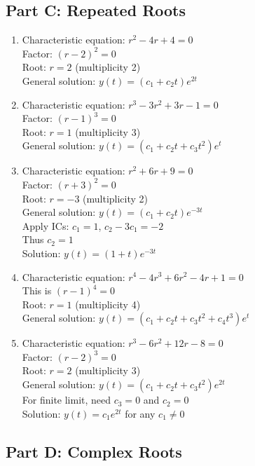 \documentclass[12pt]{article}
\begin{document}
\subsection*{Part C: Repeated Roots}

\begin{enumerate}[resume]
\item Characteristic equation: $r^2 - 4r + 4 = 0$\\
Factor: $(r-2)^2 = 0$\\
Root: $r = 2$ (multiplicity 2)\\
General solution: $y(t) = (c_1 + c_2t)e^{2t}$

\item Characteristic equation: $r^3 - 3r^2 + 3r - 1 = 0$\\
Factor: $(r-1)^3 = 0$\\
Root: $r = 1$ (multiplicity 3)\\
General solution: $y(t) = (c_1 + c_2t + c_3t^2)e^t$

\item Characteristic equation: $r^2 + 6r + 9 = 0$\\
Factor: $(r+3)^2 = 0$\\
Root: $r = -3$ (multiplicity 2)\\
General solution: $y(t) = (c_1 + c_2t)e^{-3t}$\\
Apply ICs: $c_1 = 1$, $c_2 - 3c_1 = -2$\\
Thus $c_2 = 1$\\
Solution: $y(t) = (1 + t)e^{-3t}$

\item Characteristic equation: $r^4 - 4r^3 + 6r^2 - 4r + 1 = 0$\\
This is $(r-1)^4 = 0$\\
Root: $r = 1$ (multiplicity 4)\\
General solution: $y(t) = (c_1 + c_2t + c_3t^2 + c_4t^3)e^t$

\item Characteristic equation: $r^3 - 6r^2 + 12r - 8 = 0$\\
Factor: $(r-2)^3 = 0$\\
Root: $r = 2$ (multiplicity 3)\\
General solution: $y(t) = (c_1 + c_2t + c_3t^2)e^{2t}$\\
For finite limit, need $c_3 = 0$ and $c_2 = 0$\\
Solution: $y(t) = c_1e^{2t}$ for any $c_1 \neq 0$
\end{enumerate}

\subsection*{Part D: Complex Roots}
\end{document}
